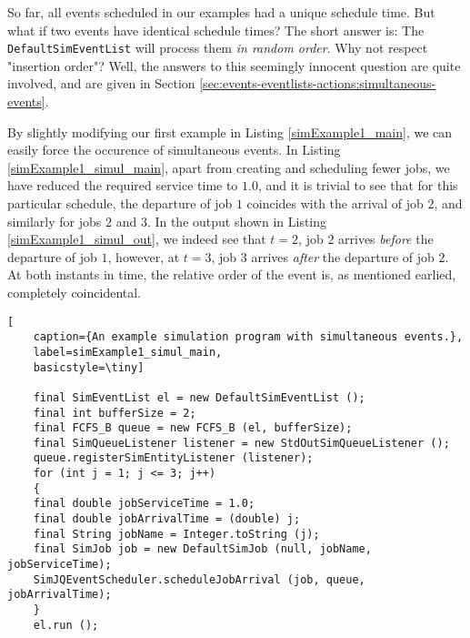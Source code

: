 So far, all events scheduled in our examples had a unique schedule time.
But what if two events have identical schedule times?
The short answer is: The \lstinline|DefaultSimEventList| will
process them {\em in random order}.
Why not respect "insertion order"?
Well, the answers to this seemingly innocent question
are quite involved, and are given in
Section \ref{sec:events-eventlists-actions:simultaneous-events}.

By slightly modifying our first example in Listing \ref{simExample1_main},
we can easily force the occurence of simultaneous events.
In Listing \ref{simExample1_simul_main},
apart from creating and scheduling fewer jobs,
we have reduced the required service time to $1.0$,
and it is trivial to see that for this particular
schedule, the departure of job $1$ coincides
with the arrival of job $2$,
and similarly for jobs $2$ and $3$.
In the output shown in Listing \ref{simExample1_simul_out},
we indeed see that $t=2$,
job $2$ arrives {\em before\/}
the departure of job $1$,
however,
at $t=3$,
job $3$ arrives {\em after\/}
the departure of job $2$.
At both instants in time,
the relative order of the event is,
as mentioned earlied,
completely coincidental.

\begin{lstfloat}
	\begin{lstlisting}[
	caption={An example simulation program with simultaneous events.},
	label=simExample1_simul_main,
	basicstyle=\tiny]
	
	final SimEventList el = new DefaultSimEventList ();
	final int bufferSize = 2;
	final FCFS_B queue = new FCFS_B (el, bufferSize);
	final SimQueueListener listener = new StdOutSimQueueListener ();
	queue.registerSimEntityListener (listener);
	for (int j = 1; j <= 3; j++)
	{
	final double jobServiceTime = 1.0;
	final double jobArrivalTime = (double) j;
	final String jobName = Integer.toString (j);
	final SimJob job = new DefaultSimJob (null, jobName, jobServiceTime);
	SimJQEventScheduler.scheduleJobArrival (job, queue, jobArrivalTime);
	}
	el.run ();
	
	\end{lstlisting}
\end{lstfloat}

